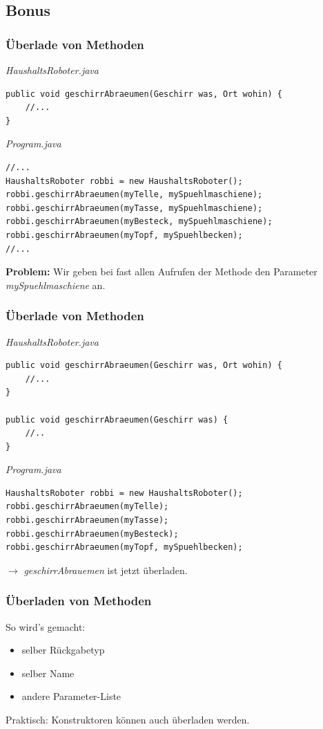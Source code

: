 \documentclass[18pt]{beamer}
\begin{document}
\subsection{Bonus}
\begin{frame}[containsverbatim]
	\frametitle{Überlade von Methoden}
	
	\emph{HaushaltsRoboter.java}
	\begin{lstlisting}
public void geschirrAbraeumen(Geschirr was, Ort wohin) {
	//...
}
	\end{lstlisting}
	
	\emph{Program.java}
	\begin{lstlisting}
//...
HaushaltsRoboter robbi = new HaushaltsRoboter();
robbi.geschirrAbraeumen(myTelle, mySpuehlmaschiene);
robbi.geschirrAbraeumen(myTasse, mySpuehlmaschiene);
robbi.geschirrAbraeumen(myBesteck, mySpuehlmaschiene);
robbi.geschirrAbraeumen(myTopf, mySpuehlbecken);
//...
	\end{lstlisting}
	
	
	\textbf{Problem:} Wir geben bei fast allen Aufrufen der Methode den Parameter \emph{mySpuehlmaschiene} an.
\end{frame}

\begin{frame}[containsverbatim]
	\frametitle{Überlade von Methoden}
	
	\emph{HaushaltsRoboter.java}
	\begin{lstlisting}
public void geschirrAbraeumen(Geschirr was, Ort wohin) {
	//...
}
		
public void geschirrAbraeumen(Geschirr was) {
	//..
}
	\end{lstlisting}
	
	\emph{Program.java}
	\begin{lstlisting}
HaushaltsRoboter robbi = new HaushaltsRoboter();
robbi.geschirrAbraeumen(myTelle);
robbi.geschirrAbraeumen(myTasse);
robbi.geschirrAbraeumen(myBesteck);
robbi.geschirrAbraeumen(myTopf, mySpuehlbecken);
	\end{lstlisting}
	
	
	$\rightarrow$ \emph{geschirrAbrauemen} ist jetzt überladen.
\end{frame}

\begin{frame}
	\frametitle{Überladen von Methoden}
	
	So wird's gemacht:
	\begin{itemize}
		\item selber Rückgabetyp
		\item selber Name
		\item andere Parameter-Liste
	\end{itemize}
	
	
	Praktisch: Konstruktoren können auch überladen werden.
\end{frame}
\end{document}

